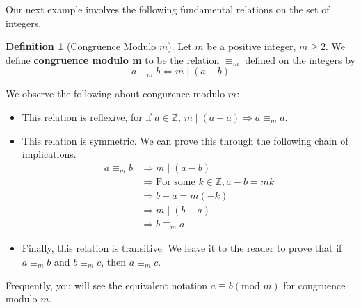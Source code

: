 \documentclass[10pt,]{book}
\newcommand{\terminology}[1]{\textbf{#1}}
\theoremstyle{plain}
\theoremstyle{definition}
\newtheorem{definition}[theorem]{Definition}
\theoremstyle{definition}
\theoremstyle{definition}
\theoremstyle{definition}
\begin{document}
\par
Our next example involves the following fundamental relations on the set of integers.%
\begin{definition}[Congruence Modulo \(m\)]\label{def-congruence-mod-m}
\label{notation-4}
Let \(m\) be a positive integer, \(m\geq 2\).  We define \terminology{congruence modulo m} to be the relation \(\equiv_m\) defined on the integers by 
	\[a \equiv_m b \Leftrightarrow m \mid (a-b)\]
%
\end{definition}
\par
We observe the following about congurence modulo \(m\):%
\par
\leavevmode%
\begin{itemize}[label=\textbullet]
\item{}This relation is reflexive, for if \(a \in  \mathbb{Z} \),  \(m \mid (a-a) \Rightarrow  a\equiv_ma \).%
\item{}This relation is symmetric. We can prove this through the following chain of implications. 
\begin{equation*}
\begin{split}
a \equiv_m b &\Rightarrow   m \mid (a-b)\\
   & \Rightarrow \textrm{For  some } k \in \mathbb{Z}, a-b = m k \\
	& \Rightarrow b-a = m (-k)\\
	& \Rightarrow  m \mid (b-a)\\
	& \Rightarrow b \equiv_m a 
\end{split}
\end{equation*}%
\item{} Finally, this relation is transitive.  We leave it to the reader to prove that if \(a \equiv _mb \) and \(b\equiv _mc\), then \(a \equiv _mc\).%
\end{itemize}
%
\par
Frequently, you will see the equivalent notation \(a \equiv b (\textrm{mod } m)\) for congruence modulo \(m\).%
\end{document}

